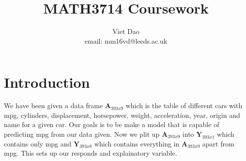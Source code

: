 \documentclass[11pt]{article} %
\title{MATH3714 Coursework}
\author{Viet Dao\\email: mm16vd@leeds.ac.uk}
\begin{document}
\maketitle
\newpage
\tableofcontents
\newpage

\section{Introduction}
We have been given a data frame $\textbf{A}_{393x9}$ which is the table of different cars with mpg, cylinders, displacement, horsepower, weight, acceleration, year, origin and name for a given car. Our goals is to be make a model that is capable of predicting mpg from our data given. Now we plit up $\textbf{A}_{393x9}$ into $\textbf{Y}_{393x1}$ which contains only mpg and $\textbf{Y}_{393x8}$ which contains everything in $\textbf{A}_{393x9}$ apart from mpg. This sets up our responds and explainatory variable.
\end{document}
